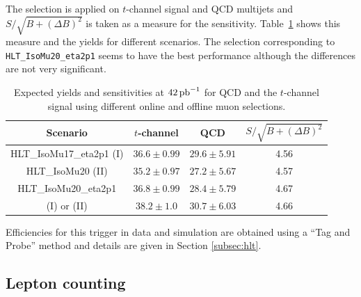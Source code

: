 The selection is applied on $t$-channel signal and QCD multijets and $S/\sqrt{B+(\Delta B)^2}$ is taken as a measure for the sensitivity. Table~\ref{tab:hltSensitivity} shows this measure and the yields for different scenarios. The selection corresponding to \verb+HLT_IsoMu20_eta2p1+ seems to have the best performance although the differences are not very significant.

 \begin{table}[t!] 
 \caption{Expected yields and sensitivities at $42\,{\rm pb}^{-1}$ for QCD and the $t$-channel signal using different online and offline muon selections. }
  \label{tab:hltSensitivity}
 \begin{center}
\begin{tabular}{|c|c|c|c|}
\hline
Scenario 	& $t$-channel&QCD&$S/\sqrt{B+(\Delta B)^2}$\\
\hline
\small{HLT\_IsoMu17\_eta2p1 (I)}	& $36.6\pm0.99$	&$29.6\pm5.91$	&4.56\\
\small{HLT\_IsoMu20 (II)}			& $35.2\pm0.97$	&$27.2\pm5.67$	&4.57\\
\small{HLT\_IsoMu20\_eta2p1} 		& $36.8\pm0.99$	&$28.4\pm5.79$ 	&4.67\\
\small{(I) or (II)}					& $38.2\pm1.0$	&$30.7\pm6.03$	&4.66\\
\hline
\end{tabular}
\end{center}
\end{table}

Efficiencies for this trigger in data and simulation are obtained using a ``Tag and Probe'' method and details are given in Section \ref{subsec:hlt}. 




\subsection{Lepton counting}
\label{sec:leptoncounting}

